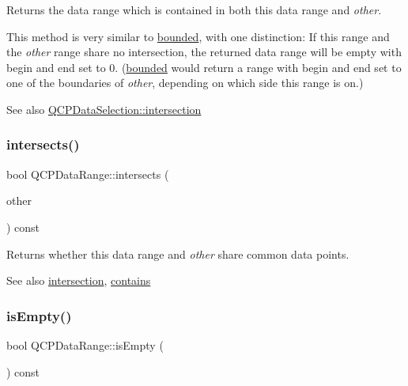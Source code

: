Returns the data range which is contained in both this data range and {\itshape other}.

This method is very similar to \mbox{\hyperlink{class_q_c_p_data_range_a93529421d12fdd3a8bdb2b8061936352}{bounded}}, with one distinction\+: If this range and the {\itshape other} range share no intersection, the returned data range will be empty with begin and end set to 0. (\mbox{\hyperlink{class_q_c_p_data_range_a93529421d12fdd3a8bdb2b8061936352}{bounded}} would return a range with begin and end set to one of the boundaries of {\itshape other}, depending on which side this range is on.)

\begin{DoxySeeAlso}{See also}
\mbox{\hyperlink{class_q_c_p_data_selection_af5267ced53687561367105ee77b874ab}{Q\+C\+P\+Data\+Selection\+::intersection}} 
\end{DoxySeeAlso}
\mbox{\label{class_q_c_p_data_range_a8a1c437f9beffd55621f48f961d7f679}} 
\subsubsection{\texorpdfstring{intersects()}{intersects()}}
{\footnotesize\ttfamily bool Q\+C\+P\+Data\+Range\+::intersects (\begin{DoxyParamCaption}\item[{const \mbox{\hyperlink{class_q_c_p_data_range}{Q\+C\+P\+Data\+Range}} \&}]{other }\end{DoxyParamCaption}) const}

Returns whether this data range and {\itshape other} share common data points.

\begin{DoxySeeAlso}{See also}
\mbox{\hyperlink{class_q_c_p_data_range_a84e1e03129dd52528efb4bac18d30183}{intersection}}, \mbox{\hyperlink{class_q_c_p_data_range_a13ca398776374a3160aa85433718b812}{contains}} 
\end{DoxySeeAlso}
\mbox{\label{class_q_c_p_data_range_ac32e53fc05d6cd2eac96b96a7265d3b8}} 
\subsubsection{\texorpdfstring{is\+Empty()}{isEmpty()}}
{\footnotesize\ttfamily bool Q\+C\+P\+Data\+Range\+::is\+Empty (\begin{DoxyParamCaption}{ }\end{DoxyParamCaption}) const\hspace{0.3cm}{\ttfamily [inline]}}

